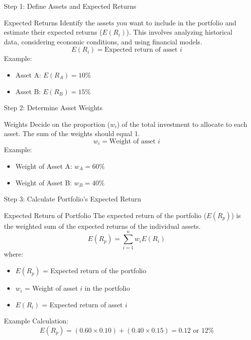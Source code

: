\documentclass{beamer}
\begin{document}
\begin{frame}{Step 1: Define Assets and Expected Returns}
  \begin{block}{Expected Returns}
    Identify the assets you want to include in the portfolio and estimate their expected returns (\(E(R_i)\)). This involves analyzing historical data, considering economic conditions, and using financial models.
    \begin{equation*}
      E(R_i) = \text{Expected return of asset } i
    \end{equation*}
    Example: 
    \begin{itemize}
      \item Asset A: \(E(R_A) = 10\%\)
      \item Asset B: \(E(R_B) = 15\%\)
    \end{itemize}
  \end{block}
\end{frame}

\begin{frame}{Step 2: Determine Asset Weights}
  \begin{block}{Weights}
    Decide on the proportion (\(w_i\)) of the total investment to allocate to each asset. The sum of the weights should equal 1.
    \begin{equation*}
      w_i = \text{Weight of asset } i
    \end{equation*}
    Example:
    \begin{itemize}
      \item Weight of Asset A: \(w_A = 60\%\)
      \item Weight of Asset B: \(w_B = 40\%\)
    \end{itemize}
  \end{block}
\end{frame}

\begin{frame}{Step 3: Calculate Portfolio's Expected Return}
  \begin{block}{Expected Return of Portfolio}
    The expected return of the portfolio (\(E(R_p)\)) is the weighted sum of the expected returns of the individual assets.
    \begin{equation*}
      E(R_p) = \sum_{i=1}^{n} w_i E(R_i)
    \end{equation*}
    where:
    \begin{itemize}
      \item \( E(R_p) \) = Expected return of the portfolio
      \item \( w_i \) = Weight of asset \( i \) in the portfolio
      \item \( E(R_i) \) = Expected return of asset \( i \)
    \end{itemize}
    Example Calculation:
    \begin{equation*}
      E(R_p) = (0.60 \times 0.10) + (0.40 \times 0.15) = 0.12 \text{ or 12\%}
    \end{equation*}
  \end{block}
\end{frame}
\end{document}
